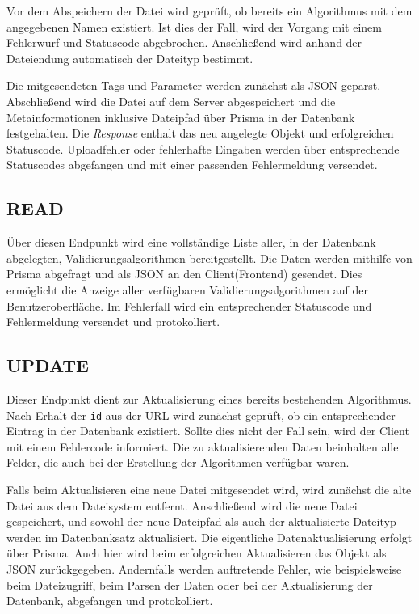 Vor dem Abspeichern der Datei wird geprüft, ob bereits ein Algorithmus mit dem angegebenen Namen existiert. Ist dies der Fall, wird der Vorgang mit einem Fehlerwurf und Statuscode abgebrochen. Anschließend wird anhand der Dateiendung automatisch der Dateityp bestimmt.

Die mitgesendeten Tags und Parameter werden zunächst als JSON geparst. Abschließend wird die Datei auf dem Server abgespeichert und die Metainformationen inklusive Dateipfad über Prisma in der Datenbank festgehalten. Die \textit{Response} enthalt das neu angelegte Objekt und erfolgreichen Statuscode. Uploadfehler oder fehlerhafte Eingaben werden über entsprechende Statuscodes abgefangen und mit einer passenden Fehlermeldung versendet.

\subsection{READ}


Über diesen Endpunkt wird eine vollständige Liste aller, in der Datenbank abgelegten, Validierungsalgorithmen bereitgestellt. Die Daten werden mithilfe von Prisma abgefragt und als JSON an den Client(Frontend) gesendet. Dies ermöglicht die Anzeige aller verfügbaren Validierungsalgorithmen auf der Benutzeroberfläche. Im Fehlerfall wird ein entsprechender Statuscode und Fehlermeldung versendet und protokolliert.

\subsection{UPDATE}


Dieser Endpunkt dient zur Aktualisierung eines bereits bestehenden Algorithmus. Nach Erhalt der \texttt{id} aus der URL wird zunächst geprüft, ob ein entsprechender Eintrag in der Datenbank existiert. Sollte dies nicht der Fall sein, wird der Client mit einem Fehlercode informiert. Die zu aktualisierenden Daten beinhalten alle Felder, die auch bei der Erstellung der Algorithmen verfügbar waren.

Falls beim Aktualisieren eine neue Datei mitgesendet wird, wird zunächst die alte Datei aus dem Dateisystem entfernt. Anschließend wird die neue Datei gespeichert, und sowohl der neue Dateipfad als auch der aktualisierte Dateityp werden im Datenbanksatz aktualisiert. Die eigentliche Datenaktualisierung erfolgt über Prisma. Auch hier wird beim erfolgreichen Aktualisieren das Objekt als JSON zurückgegeben. Andernfalls werden auftretende Fehler, wie beispielsweise beim Dateizugriff, beim Parsen der Daten oder bei der Aktualisierung der Datenbank, abgefangen und protokolliert.

